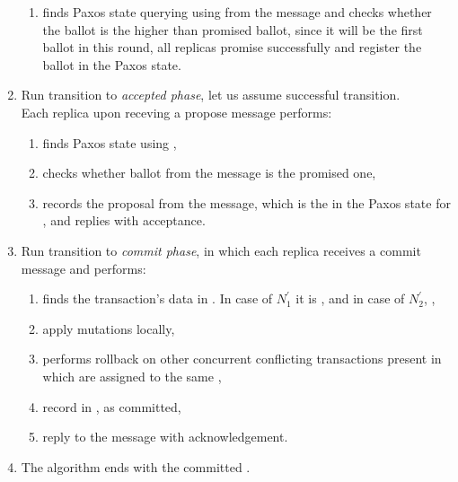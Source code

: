 \begin{enumerate}
  \begin{enumerate}
  	\item finds Paxos state querying \txIndex using \txState from the message and checks whether the ballot is the higher than promised ballot, since it will be the first ballot in this round, all replicas promise successfully and register the ballot in the Paxos state.
  \end{enumerate}

\item Run transition to \emph{accepted phase}, let us assume successful transition. \\
	Each replica upon receving a propose message performs:

	\begin{enumerate}
		\item finds Paxos state using \txState,
		\item checks whether ballot from the message is the promised one,
		\item records the proposal from the message, which is the \txState in the Paxos state for \transaction, and replies with acceptance.
	\end{enumerate}

\item Run transition to \emph{commit phase}, in which each replica receives a commit message and performs:

	\begin{enumerate}
		\item finds the transaction's data in \txStorage. In case of $N^'_1$ it is , and in case of $N^'_2$,  ,
		\item apply mutations locally,
		\item performs rollback on other concurrent conflicting transactions present in \conflictingTxSet which are assigned to the same ,
		\item record \txState in \txLog, as committed,
		\item reply to the message with acknowledgement.
	\end{enumerate}

\item The algorithm ends with the committed \transaction.

\end{enumerate}



